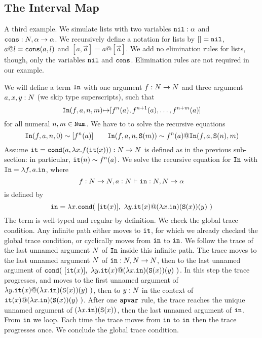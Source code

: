 \documentclass{article}
\begin{document}
\subsection{The Interval Map}
A third example. We simulate lists with two variables ${\tt nil}:\alpha$ and 
${\tt cons}:{N},\alpha \rightarrow \alpha$. We recursively define a notation for lists by $[]={\tt nil}$,
$a @ l={\tt cons}(a,l)$ and $[a,\vec{a}] = a @ [\vec{a}]$. We add no elimination rules for lists, though,
only the variables ${\tt nil}$ and ${\tt cons}$. Elimination rules are not required in our example.

We will define a term ${\tt In}$ with one argument $f:{N} \rightarrow {N}$ and three argument
$a,x,y:{N}$ (we skip type superscripts), such that 
$$
{\tt In}(f,a,n,m) {\mapsto} [f^n(a), f^{n+1}(a), \ldots, f^{n+m}(a)]
$$ 
for all numeral $n,m \in {\tt Num}$. 
We have to to solve the recursive equations 
$$
\Interval(f,a,n,0)  \sim [f^n(a)]
\ \ \ \ \ \ 
\Interval(f,a,n,\Succ (m))  \sim f^n(a) @ \Interval(f,a,\Succ(n),m)
$$ 
Assume ${\tt it} = {\tt cond} (a, \lambda x.f({\tt it}(x))):{N} \rightarrow {N}$ is defined 
as in the previous sub-section: in particular, ${\tt it}(n) \sim f^n(a)$.
We solve the recursive equation for ${\tt In}$ with ${\tt In} = \lambda f,a.{\tt in}$,
where 
$$
f:{N}\rightarrow{N}, a:{N} \vdash {\tt in}:{N},{N} \rightarrow \alpha
$$
is defined by 
$$
{\tt in} 
= 
\lambda x.{\tt cond} (\ [{\tt it}(x)],  \  \lambda y.{\tt it}(x) @ (\lambda x.{\tt in})({\tt S}(x))(y) \ )
$$ 
The term is well-typed and regular by definition. We check the global trace condition.
Any infinite path either moves to ${\tt it}$, for which we already checked the global trace condition,
or cyclically moves from ${\tt in}$ to ${\tt in}$.
We follow the trace of the last unnamed argument ${N}$ of ${\tt In}$ inside this infinite
path.
The trace moves to the last unnamed argument ${N}$ of  
${\tt in}:{N},{N} \rightarrow {N}$, then to the last unnamed argument of
$\cond (\ [\iter(x)],  \  \lambda y.\iter(x) @ (\lambda x.\interval)(\Succ(x))(y) \ )$.
In this step the trace progresses, and moves to 
the first unnamed argument of $\lambda y.{\tt it}(x) @ (\lambda x.{\tt in})({\tt S}(x))(y) \ )$,
then to $y:{N}$ in the context of $\iter(x) @ (\lambda x.\interval)(\Succ(x))(y) \ )$.
After one ${\tt apvar}$ rule, the trace reaches the unique unnamed argument of 
$(\lambda x.{\tt in})({\tt S}(x))$, then the last unnamed argument of ${\tt in}$. 
From ${\tt in}$ we loop. Each time the trace moves from ${\tt in}$ to ${\tt in}$
then the trace progresses once. We conclude the global trace condition.

\end{document}
